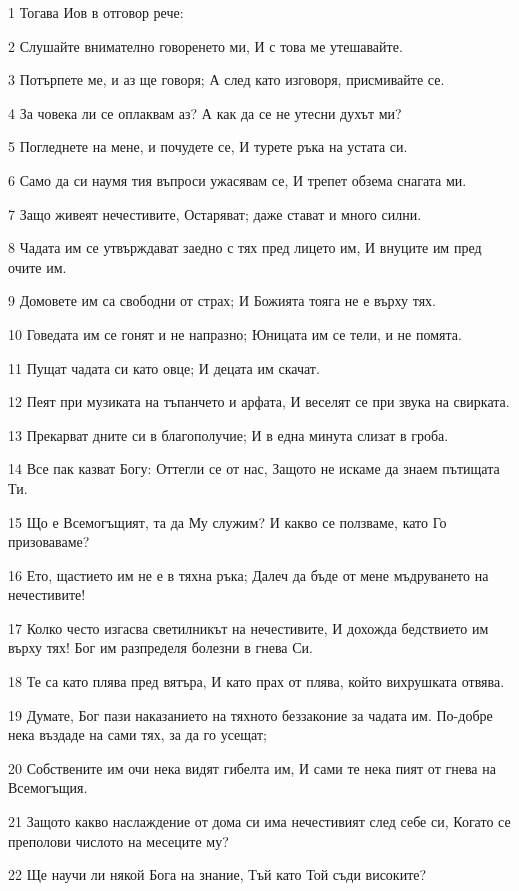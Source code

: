 \par 1 Тогава Иов в отговор рече:
\par 2 Слушайте внимателно говоренето ми, И с това ме утешавайте.
\par 3 Потърпете ме, и аз ще говоря; А след като изговоря, присмивайте се.
\par 4 За човека ли се оплаквам аз? А как да се не утесни духът ми?
\par 5 Погледнете на мене, и почудете се, И турете ръка на устата си.
\par 6 Само да си наумя тия въпроси ужасявам се, И трепет обзема снагата ми.
\par 7 Защо живеят нечестивите, Остаряват; даже стават и много силни.
\par 8 Чадата им се утвърждават заедно с тях пред лицето им, И внуците им пред очите им.
\par 9 Домовете им са свободни от страх; И Божията тояга не е върху тях.
\par 10 Говедата им се гонят и не напразно; Юницата им се тели, и не помята.
\par 11 Пущат чадата си като овце; И децата им скачат.
\par 12 Пеят при музиката на тъпанчето и арфата, И веселят се при звука на свирката.
\par 13 Прекарват дните си в благополучие; И в една минута слизат в гроба.
\par 14 Все пак казват Богу: Оттегли се от нас, Защото не искаме да знаем пътищата Ти.
\par 15 Що е Всемогъщият, та да Му служим? И какво се ползваме, като Го призоваваме?
\par 16 Ето, щастието им не е в тяхна ръка; Далеч да бъде от мене мъдруването на нечестивите!
\par 17 Колко често изгасва светилникът на нечестивите, И дохожда бедствието им върху тях! Бог им разпределя болезни в гнева Си.
\par 18 Те са като плява пред вятъра, И като прах от плява, който вихрушката отвява.
\par 19 Думате, Бог пази наказанието на тяхното беззаконие за чадата им. По-добре нека въздаде на сами тях, за да го усещат;
\par 20 Собствените им очи нека видят гибелта им, И сами те нека пият от гнева на Всемогъщия.
\par 21 Защото какво наслаждение от дома си има нечестивият след себе си, Когато се преполови числото на месеците му?
\par 22 Ще научи ли някой Бога на знание, Тъй като Той съди високите?
